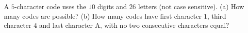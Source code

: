 A $5$-character code uses the $10$ digits and $26$ letters (not case sensitive). (a) How many codes are possible? (b) How many codes have first character $1$, third character $4$ and last character A, with no two consecutive characters equal?
